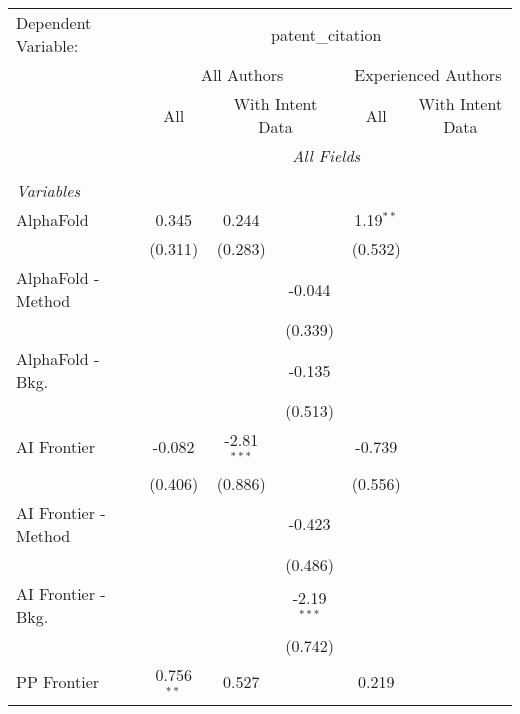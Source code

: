 \begingroup
\centering
\begin{tabular}{lcccccc}
   \tabularnewline \midrule \midrule
   Dependent Variable: & \multicolumn{6}{c}{patent\_citation}\\
 & \multicolumn{3}{c}{All Authors} & \multicolumn{3}{c}{Experienced Authors} \\
\cmidrule(lr){2-4} \cmidrule(lr){5-7}
 & \multicolumn{1}{c}{All} & \multicolumn{2}{c}{With Intent Data} & \multicolumn{1}{c}{All} & \multicolumn{2}{c}{With Intent Data} \\
\cmidrule(lr){2-2} \cmidrule(lr){3-4} \cmidrule(lr){5-5} \cmidrule(lr){6-7}
 & \multicolumn{6}{c}{\textit{All Fields}} \\ \\
   \emph{Variables}\\
   AlphaFold            & 0.345        & 0.244         &               & 1.19$^{**}$ &        &   \\   
                        & (0.311)      & (0.283)       &               & (0.532)     &        &   \\   
   AlphaFold - Method   &              &               & -0.044        &             &        &   \\   
                        &              &               & (0.339)       &             &        &   \\   
   AlphaFold - Bkg.     &              &               & -0.135        &             &        &   \\   
                        &              &               & (0.513)       &             &        &   \\   
   AI Frontier          & -0.082       & -2.81$^{***}$ &               & -0.739      &        &   \\   
                        & (0.406)      & (0.886)       &               & (0.556)     &        &   \\   
   AI Frontier - Method &              &               & -0.423        &             &        &   \\   
                        &              &               & (0.486)       &             &        &   \\   
   AI Frontier - Bkg.   &              &               & -2.19$^{***}$ &             &        &   \\   
                        &              &               & (0.742)       &             &        &   \\   
   PP Frontier          & 0.756$^{**}$ & 0.527         &               & 0.219       &        &   \\   

\end{tabular}
